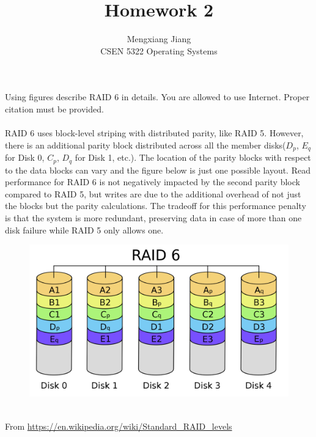 \documentclass[12pt]{article}
\newenvironment{problem}[2][Problem]{\begin{trivlist}
\item[\hskip \labelsep {\bfseries #1}\hskip \labelsep {\bfseries #2.}]}{\end{trivlist}}
\begin{document}
 
 
\title{Homework 2}%
\author{Mengxiang Jiang\\ %
CSEN 5322 Operating Systems} %
 
\maketitle
 
\begin{problem}{1} %
Using figures describe RAID 6 in details. You are allowed to use Internet.
Proper citation must be provided.\\\\
RAID 6 uses block-level striping with distributed parity, like RAID 5.
However, there is an additional parity block distributed across all the member disks($D_p$, $E_q$ for Disk 0, $C_p$, $D_q$ for Disk 1, etc.).
The location of the parity blocks with respect to the data blocks can vary and the figure below is just one possible layout.
Read performance for RAID 6 is not negatively impacted by the second parity block compared to RAID 5, 
but writes are due to the additional overhead of not just the blocks but the parity calculations. 
The tradeoff for this performance penalty is that the system is more redundant, 
preserving data in case of more than one disk failure while RAID 5 only allows one.
\begin{figure}[ht]
    \centering
    \includegraphics[width=\textwidth]{raid6}
\end{figure}
\\From \url{https://en.wikipedia.org/wiki/Standard_RAID_levels}
\end{problem}
\end{document}
